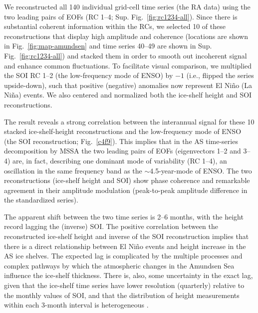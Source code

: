 We reconstructed all 140 individual grid-cell time series (the RA data) using the two leading pairs of EOFs (RC 1--4; Sup. Fig.~\ref{fig:rc1234-all}). Since there is substantial coherent information within the RCs, we selected 10 of these reconstructions that display high amplitude and coherence (locations are shown in Fig.~\ref{fig:map-amundsen} and time series 40--49 are shown in Sup. Fig.~\ref{fig:rc1234-all}) and stacked them in order to smooth out incoherent signal and enhance common fluctuations. To facilitate visual comparison, we multiplied the SOI RC 1--2 (the low-frequency mode of ENSO) by $-1$ (i.e., flipped the series upside-down), such that positive (negative) anomalies now represent El Ni\~no (La Ni\~na) events. We also centered and normalized both the ice-shelf height and SOI reconstructions.

The result reveals a strong correlation between the interannual signal for these 10 stacked ice-shelf-height reconstructions and the low-frequency mode of ENSO (the SOI reconstruction; Fig.~\ref{c4f9}). This implies that in the AS time-series decomposition by MSSA the two leading pairs of EOFs (eigenvectors 1--2 and 3--4) are, in fact, describing one dominant mode of variability (RC 1--4), an oscillation in the same frequency band as the $\sim$4.5-year-mode of ENSO. The two reconstructions (ice-shelf height and SOI) show phase coherence and remarkable agreement in their amplitude modulation (peak-to-peak amplitude difference in the standardized series).

The apparent shift between the two time series is 2--6 months, with the height record lagging the (inverse) SOI. The positive correlation between the reconstructed ice-shelf height and inverse of the SOI reconstruction implies that there is a direct relationship between El Ni\~no events and height increase in the AS ice shelves. The expected lag is complicated by the multiple processes and complex pathways by which the atmospheric changes in the Amundsen Sea influence the ice-shelf thickness. There is, also, some uncertainty in the exact lag, given that the ice-shelf time series have lower resolution (quarterly) relative to the monthly values of SOI, and that the distribution of height measurements within each 3-month interval is heterogeneous \parencite{Paolo2015a}. 


